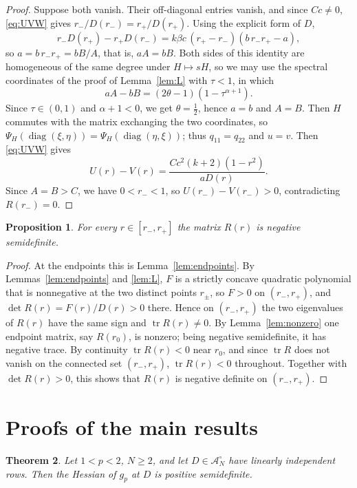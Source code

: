 \documentclass[11pt]{amsart}
\newtheorem{theorem}{Theorem}[section]
\newtheorem{proposition}[theorem]{Proposition}
\theoremstyle{definition}
\theoremstyle{remark}
\numberwithin{equation}{section}
\newcommand{\tr}{\operatorname{tr}}
\newcommand{\diag}{\operatorname{diag}}
\newcommand{\cA}{\mathcal{A}}
\begin{document}
\begin{proof}
Suppose both vanish. Their off-diagonal entries vanish, and since $Cc\ne0$, \eqref{eq:UVW} gives $r_-/D(r_-)=r_+/D(r_+)$. Using the explicit form of $D$,
\[
r_-D(r_+)-r_+D(r_-)=k\beta c\,(r_+-r_-)(b\,r_-r_+-a),
\]
so $a=b\,r_-r_+=bB/A$, that is, $aA=bB$. Both sides of this identity are homogeneous of the same degree under $H\mapsto sH$, so we may use the spectral coordinates of the proof of Lemma~\ref{lem:L} with $\tau<1$, in which
\[
aA-bB=(2\theta-1)(1-\tau^{\alpha+1}).
\]
Since $\tau\in(0,1)$ and $\alpha+1<0$, we get $\theta=\frac12$, hence $a=b$ and $A=B$. Then $H$ commutes with the matrix exchanging the two coordinates, so $\Psi_H(\diag(\xi,\eta))=\Psi_H(\diag(\eta,\xi))$; thus $q_{11}=q_{22}$ and $u=v$. Then \eqref{eq:UVW} gives
\[
U(r)-V(r)=\frac{Cc^2(k+2)(1-r^2)}{aD(r)} .
\]
Since $A=B>C$, we have $0<r_-<1$, so $U(r_-)-V(r_-)>0$, contradicting $R(r_-)=0$.
\end{proof}

\begin{proposition}\label{prop:three}
For every $r\in[r_-,r_+]$ the matrix $R(r)$ is negative semidefinite.
\end{proposition}

\begin{proof}
At the endpoints this is Lemma~\ref{lem:endpoints}. By Lemmas~\ref{lem:endpoints} and \ref{lem:L}, $F$ is a strictly concave quadratic polynomial that is nonnegative at the two distinct points $r_\pm$, so $F>0$ on $(r_-,r_+)$, and $\det R(r)=F(r)/D(r)>0$ there. Hence on $(r_-,r_+)$ the two eigenvalues of $R(r)$ have the same sign and $\tr R(r)\ne0$. By Lemma~\ref{lem:nonzero} one endpoint matrix, say $R(r_0)$, is nonzero; being negative semidefinite, it has negative trace. By continuity $\tr R(r)<0$ near $r_0$, and since $\tr R$ does not vanish on the connected set $(r_-,r_+)$, $\tr R(r)<0$ throughout. Together with $\det R(r)>0$, this shows that $R(r)$ is negative definite on $(r_-,r_+)$.
\end{proof}

\section{Proofs of the main results}\label{sec:proofs}

\begin{theorem}\label{thm:hessian}
Let $1<p<2$, $N\ge2$, and let $D\in\cA_N^\circ$ have linearly independent rows. Then the Hessian of $g_p$ at $D$ is positive semidefinite.
\end{theorem}
\end{document}
